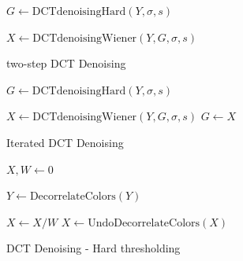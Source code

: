 \documentclass{ipol}
\begin{document}
\begin{algorithm}
\DontPrintSemicolon
{}

$G \gets  \text{DCTdenoisingHard}(Y,\sigma, s)$\;

$X \gets  \text{DCTdenoisingWiener}(Y,G,\sigma, s)$\;

\caption{two-step DCT Denoising}
\label{alg:2stepdct}

\end{algorithm}







\begin{algorithm}
\DontPrintSemicolon
{}

$G \gets  \text{DCTdenoisingHard}(Y,\sigma, s)$\;

 {
$X \gets  \text{DCTdenoisingWiener}(Y,G,\sigma, s)$\;
$G \gets X$\;
}
\caption{Iterated DCT Denoising}
\label{alg:iterated}

\end{algorithm}






\begin{algorithm}
\DontPrintSemicolon
{}

$X, W \gets  0$\;

$Y \gets   \text{DecorrelateColors}(Y)$\;

    $ X \gets  X / W$ \;
	$X \gets   \text{UndoDecorrelateColors}(X)$\;

\caption{DCT Denoising - Hard thresholding}

\label{alg:dct}

\end{algorithm}
\end{document}
